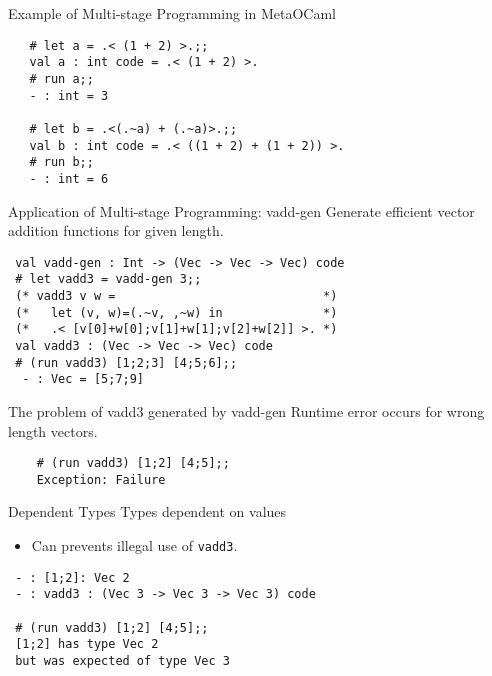 \documentclass[dvipdfmx,aspectratio=169, 20pt]{beamer}
\begin{document}
\begin{frame}[fragile]{Example of Multi-stage Programming in MetaOCaml}
    \begin{center}
        \begin{verbatim}
   # let a = .< (1 + 2) >.;;
   val a : int code = .< (1 + 2) >.
   # run a;;
   - : int = 3

   # let b = .<(.~a) + (.~a)>.;;
   val b : int code = .< ((1 + 2) + (1 + 2)) >. 
   # run b;;
   - : int = 6
        \end{verbatim}
    \end{center}
    \note{
    }
\end{frame}

\begin{frame}[fragile]{Application of Multi-stage Programming: vadd-gen}
    Generate efficient vector addition functions for given length.
    
    \begin{verbatim}
 val vadd-gen : Int -> (Vec -> Vec -> Vec) code
 # let vadd3 = vadd-gen 3;;
 (* vadd3 v w =                             *)
 (*   let (v, w)=(.~v, ,~w) in              *)
 (*   .< [v[0]+w[0];v[1]+w[1];v[2]+w[2]] >. *)
 val vadd3 : (Vec -> Vec -> Vec) code
 # (run vadd3) [1;2;3] [4;5;6];;
  - : Vec = [5;7;9]
    \end{verbatim}
    \note{
    }
\end{frame}

\begin{frame}[fragile]{The problem of vadd3 generated by vadd-gen}
    Runtime error occurs for wrong length vectors.
    \begin{verbatim}
    # (run vadd3) [1;2] [4;5];;
    Exception: Failure
    \end{verbatim}
    \note{
    }
\end{frame}

\begin{frame}[fragile]{Dependent Types}
    \renewcommand{\V}{\text{Vec}\ }
    Types dependent on values
    \begin{itemize}
        \item Can prevents illegal use of {\verb|vadd3|}.
    \end{itemize}
 \begin{verbatim}
 - : [1;2]: Vec 2
 - : vadd3 : (Vec 3 -> Vec 3 -> Vec 3) code

 # (run vadd3) [1;2] [4;5];;
 [1;2] has type Vec 2
 but was expected of type Vec 3
 \end{verbatim}
\end{frame}
\end{document}
